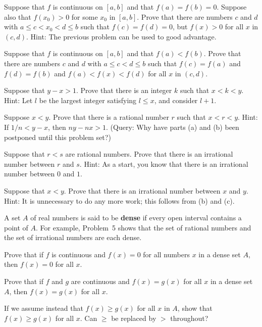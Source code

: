 \begin{letters}
\item Suppose that $f$ is continuous on $[a,b]$ and that $f(a) = f(b) = 0$.
  Suppose also that $f(x_0) > 0$ for some $x_0$ in $[a,b]$. Prove that there
  are numbers $c$ and $d$ with $a \leq c < x_0 < d \leq b$ such that
  $f(c) = f(d) = 0$, but $f(x) > 0$ for all $x$ in $(c,d)$. Hint: The
  previous problem can be used to good advantage.
\item Suppose that $f$ is continuous on $[a,b]$ and that $f(a) < f(b)$.
  Prove that there are numbers $c$ and $d$ with $a \leq c < d \leq b$ such
  that $f(c) = f(a)$ and $f(d) = f(b)$ and $f(a) < f(x) < f(d)$ for all $x$
  in $(c,d)$.
\end{letters}

\begin{letters}
\item Suppose that $y - x > 1$. Prove that there is an integer $k$ such that
  $x < k < y$. Hint: Let $l$ be the largest integer satisfying $l \leq x$,
  and consider $l + 1$.
\item Suppose $x < y$. Prove that there is a rational number $r$ such that
  $x < r < y$. Hint: If $1/n < y - x$, then $ny - nx > 1$. (Query: Why have
  parts (a) and (b) been postponed until this problem set?)
\item Suppose that $r < s$ are rational numbers. Prove that there is an
  irrational number between $r$ and $s$. Hint: As a start, you know that
  there is an irrational number between $0$ and $1$.
\item Suppose that $x < y$. Prove that there is an irrational number between
  $x$ and $y$. Hint: It is unnecessary to do any more work; this follows from
  (b) and (c).
\end{letters}

 A set $A$ of real numbers is said to be \textbf{dense} if every
open interval contains a point of $A$. For example, Problem~5 shows that the
set of rational numbers and the set of irrational numbers are each dense.
\begin{letters}
\item Prove that if $f$ is continuous and $f(x) = 0$ for all numbers $x$ in a
  dense set $A$, then $f(x) = 0$ for all $x$.
\item Prove that if $f$ and $g$ are continuous and $f(x) = g(x)$ for all $x$
  in a dense set $A$, then $f(x) = g(x)$ for all $x$.
\item If we assume instead that $f(x) \geq g(x)$ for all $x$ in $A$, show
  that $f(x) \geq g(x)$ for all $x$. Can $\geq$ be replaced by $>$ throughout?
\end{letters}

